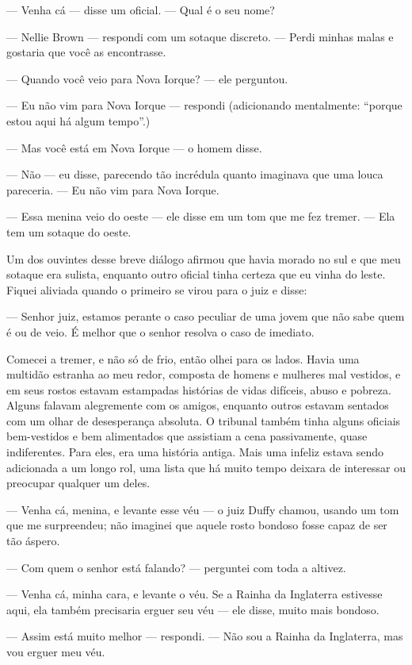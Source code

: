 --- Venha cá --- disse um oficial. --- Qual é o seu nome?

--- Nellie Brown --- respondi com um sotaque discreto. --- Perdi minhas
malas e gostaria que você as encontrasse.

--- Quando você veio para Nova Iorque? --- ele perguntou.

--- Eu não vim para Nova Iorque --- respondi (adicionando mentalmente:
``porque estou aqui há algum tempo''.)

--- Mas você está em Nova Iorque --- o homem disse.

--- Não --- eu disse, parecendo tão incrédula quanto imaginava que uma
louca pareceria. --- Eu não vim para Nova Iorque.

--- Essa menina veio do oeste --- ele disse em um tom que me fez tremer.
--- Ela tem um sotaque do oeste.

Um dos ouvintes desse breve diálogo afirmou que havia morado no sul e
que meu sotaque era sulista, enquanto outro oficial tinha certeza que eu
vinha do leste. Fiquei aliviada quando o primeiro se virou para o juiz e
disse:

--- Senhor juiz, estamos perante o caso peculiar de uma jovem que não
sabe quem é ou de veio. É melhor que o senhor resolva o caso de
imediato.

Comecei
a tremer, e não só de frio, então olhei para os lados. Havia uma
multidão estranha ao meu redor, composta de homens e mulheres mal
vestidos, e em seus rostos estavam estampadas histórias de vidas
difíceis, abuso e pobreza. Alguns falavam alegremente com os amigos,
enquanto outros estavam sentados com um olhar de desesperança absoluta.
O tribunal também tinha alguns oficiais bem-vestidos e bem alimentados
que assistiam a cena passivamente, quase indiferentes. Para eles, era
uma história antiga. Mais uma infeliz estava sendo adicionada a um longo
rol, uma lista que há muito tempo deixara de interessar ou preocupar
qualquer um deles.

--- Venha cá, menina, e levante esse véu --- o juiz Duffy chamou, usando
um tom que me surpreendeu; não imaginei que aquele rosto bondoso fosse
capaz de ser tão áspero.

--- Com quem o senhor está falando? --- perguntei com toda a altivez.

--- Venha cá, minha cara, e levante o véu. Se a Rainha da Inglaterra
estivesse aqui, ela também precisaria erguer seu véu --- ele disse,
muito mais bondoso.

--- Assim está muito melhor --- respondi. --- Não sou a Rainha da
Inglaterra, mas vou erguer meu véu.

